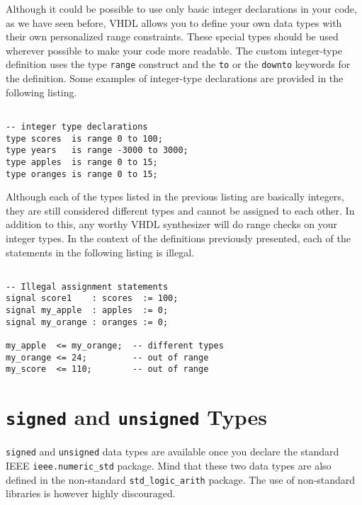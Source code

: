 Although it could be possible to use only basic integer declarations in your code, as we have seen before, VHDL allows you to define your own data types with their own personalized range constraints. These special types should be used wherever possible to make your code more readable. The custom integer-type definition uses the type \texttt{range} construct and the \texttt{to} or the \texttt{downto} keywords for the definition. Some examples of integer-type declarations are provided in the following listing.
\vspace{8pt}

\noindent
\begin{minipage}{0.99\linewidth}
\begin{lstlisting}

-- integer type declarations
type scores  is range 0 to 100;
type years   is range -3000 to 3000;
type apples  is range 0 to 15;
type oranges is range 0 to 15;
\end{lstlisting}
\end{minipage}

Although each of the types listed in the previous listing are basically integers, they are still considered different types and cannot be assigned to each other. In addition to this, any worthy VHDL synthesizer will do range checks on your integer types. In the context of the definitions previously presented, each of the statements in the following listing is illegal.
\vspace{8pt}

\noindent
\begin{minipage}{0.99\linewidth}
\begin{lstlisting}

-- Illegal assignment statements
signal score1    : scores  := 100;
signal my_apple  : apples  := 0;
signal my_orange : oranges := 0;

my_apple  <= my_orange;  -- different types
my_orange <= 24;         -- out of range
my_score  <= 110;        -- out of range
\end{lstlisting}
\end{minipage}

\section{\texttt{signed} and \texttt{unsigned} Types}
\texttt{signed} and \texttt{unsigned} data types are available once you declare the standard IEEE \texttt{ieee.numeric\_std} package. Mind that these two data types are also defined in the non-standard \texttt{std\_logic\_arith} package. The use of non-standard libraries is however highly discouraged.

